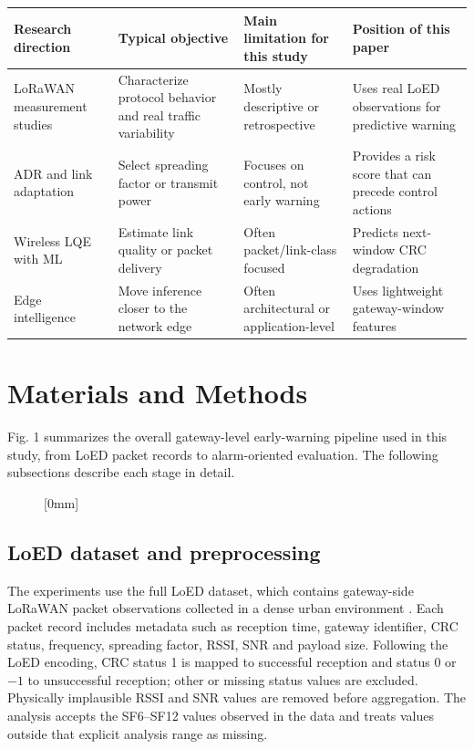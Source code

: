 \documentclass{jot}
\begin{document}
\begin{table}[t]
\centering
\begin{tabular}{@{}p{2.7cm}p{3.7cm}p{4.0cm}p{4.3cm}@{}}
\toprule
Research direction & Typical objective & Main limitation for this study & Position of this paper \\
\midrule
LoRaWAN measurement studies & Characterize protocol behavior and real traffic variability & Mostly descriptive or retrospective & Uses real LoED observations for predictive warning \\
ADR and link adaptation & Select spreading factor or transmit power & Focuses on control, not early warning & Provides a risk score that can precede control actions \\
Wireless LQE with ML & Estimate link quality or packet delivery & Often packet/link-class focused & Predicts next-window CRC degradation \\
Edge intelligence & Move inference closer to the network edge & Often architectural or application-level & Uses lightweight gateway-window features \\
\bottomrule
\end{tabular}
\end{table}

\section{Materials and Methods}\label{s:3}
Fig. 1 summarizes the overall gateway-level early-warning pipeline used in this study, from LoED packet records to alarm-oriented evaluation. The following subsections describe each stage in detail.

\begin{figure}[t]
[0mm]
\end{figure}

\subsection{LoED dataset and preprocessing}\label{s:3.1}
The experiments use the full LoED dataset, which contains gateway-side LoRaWAN packet observations collected in a dense urban environment \cite{8}. Each packet record includes metadata such as reception time, gateway identifier, CRC status, frequency, spreading factor, RSSI, SNR and payload size. Following the LoED encoding, CRC status 1 is mapped to successful reception and status 0 or $-1$ to unsuccessful reception; other or missing status values are excluded. Physically implausible RSSI and SNR values are removed before aggregation. The analysis accepts the SF6--SF12 values observed in the data and treats values outside that explicit analysis range as missing.
\end{document}
